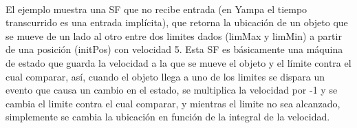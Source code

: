 \documentclass{standalone}
\begin{document}
\paragraph{}
El ejemplo muestra una SF que no recibe entrada (en Yampa el tiempo transcurrido es una entrada implícita), que retorna la ubicación de un objeto que se mueve de un lado al otro entre dos limites dados (limMax y limMin) a partir de una posición (initPos) con velocidad 5. Esta SF es básicamente una máquina de estado que guarda la velocidad a la que se mueve el objeto y el límite contra el cual comparar, así, cuando el objeto llega a uno de los limites se dispara un evento que causa un cambio en el estado, se multiplica la velocidad por -1 y se cambia el limite contra el cual comparar, y mientras el limite no sea alcanzado, simplemente se cambia la ubicación en función de la integral de la velocidad.
\end{document}
